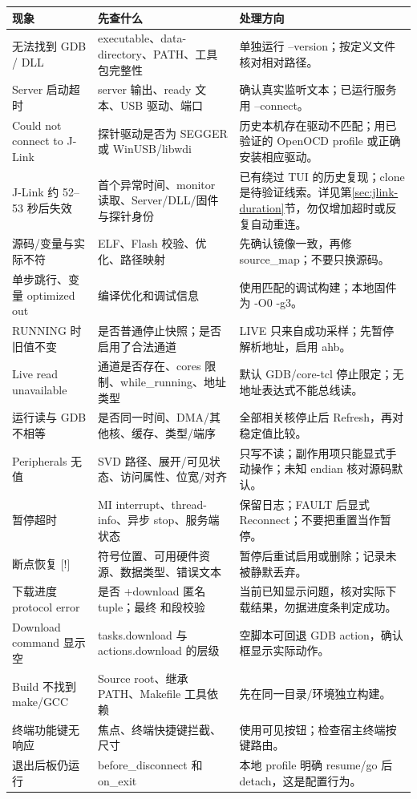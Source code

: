 \documentclass[UTF8,a4paper,11pt,oneside,fontset=none]{ctexart}
\newcommand{\code}[1]{\texttt{\detokenize{#1}}}
\begin{document}
\begin{longtable}{@{}P{35mm}P{67mm}P{59mm}@{}}\toprule
现象 & 先查什么 & 处理方向\\\midrule\endhead
无法找到 GDB / DLL & executable、data-directory、PATH、工具包完整性 & 单独运行 --version；按定义文件核对相对路径。\\
Server 启动超时 & server 输出、ready 文本、USB 驱动、端口 & 确认真实监听文本；已运行服务用 --connect。\\
Could not connect to J-Link & 探针驱动是否为 SEGGER 或 WinUSB/libwdi & 历史本机存在驱动不匹配；用已验证的 OpenOCD profile 或正确安装相应驱动。\\
J-Link 约 52--53 秒后失效 & 首个异常时间、monitor 读取、Server/DLL/固件与探针身份 & 已有绕过 TUI 的历史复现；clone 是待验证线索。详见第\ref{sec:jlink-duration}节，勿仅增加超时或反复自动重连。\\
源码/变量与实际不符 & ELF、Flash 校验、优化、路径映射 & 先确认镜像一致，再修 source\_map；不要只换源码。\\
单步跳行、变量 optimized out & 编译优化和调试信息 & 使用匹配的调试构建；本地固件为 -O0 -g3。\\
RUNNING 时旧值不变 & 是否普通停止快照；是否启用了合法通道 & LIVE 只来自成功采样；先暂停解析地址，启用 ahb。\\
Live read unavailable & 通道是否存在、cores 限制、while\_running、地址类型 & 默认 GDB/core-tcl 停止限定；无地址表达式不能总线读。\\
运行读与 GDB 不相等 & 是否同一时间、DMA/其他核、缓存、类型/端序 & 全部相关核停止后 Refresh，再对稳定值比较。\\
Peripherals 无值 & SVD 路径、展开/可见状态、访问属性、位宽/对齐 & 只写不读；副作用项只能显式手动操作；未知 endian 核对源码默认。\\
暂停超时 & MI interrupt、thread-info、异步 stop、服务端状态 & 保留日志；FAULT 后显式 Reconnect；不要把重置当作暂停。\\
断点恢复 [!] & 符号位置、可用硬件资源、数据类型、错误文本 & 暂停后重试启用或删除；记录未被静默丢弃。\\
下载进度 protocol error & 是否 +download 匿名 tuple；最终 \code{^done} 和段校验 & 当前已知显示问题，核对实际下载结果，勿据进度条判定成功。\\
Download command 显示空 & tasks.download 与 actions.download 的层级 & 空脚本可回退 GDB action，确认框显示实际动作。\\
Build 不找到 make/GCC & Source root、继承 PATH、Makefile 工具依赖 & 先在同一目录/环境独立构建。\\
终端功能键无响应 & 焦点、终端快捷键拦截、尺寸 & 使用可见按钮；检查宿主终端按键路由。\\
退出后板仍运行 & before\_disconnect 和 on\_exit & 本地 profile 明确 resume/go 后 detach，这是配置行为。\\\bottomrule
\end{longtable}
\end{document}
